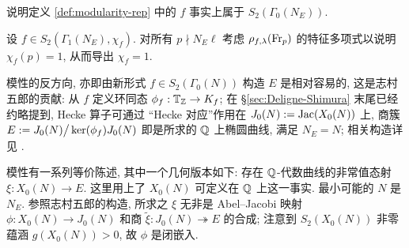 \begin{exercise}
	说明定义 \ref{def:modularity-rep} 中的 $f$ 事实上属于 $S_2\left(\Gamma_0(N_E)\right)$.
	
	\begin{hint}
		设 $f \in S_2(\Gamma_1(N_E), \chi_f)$. 对所有 $p \nmid N_E \ell$ 考虑 $\rho_{f, \lambda}(\operatorname{Fr}_p)$ 的特征多项式以说明 $\chi_f(p) = 1$, 从而导出 $\chi_f = 1$.
	\end{hint}
\end{exercise}

模性的反方向, 亦即由新形式 $f \in S_2(\Gamma_0(N))$ 构造 $E$ 是相对容易的, 这是志村五郎的贡献: 从 $f$ 定义环同态 $\phi_f: \mathbb{T}_{\mathbb{Z}} \to K_f$; 在 \S\ref{sec:Deligne-Shimura} 末尾已经约略提到, Hecke 算子可通过 ``Hecke 对应''作用在 $J_0(N) := \operatorname{Jac}(X_0(N))$ 上, 商簇 $E := J_0(N) \big/ \operatorname{ker}(\phi_f)J_0(N)$ 即是所求的 $\mathbb{Q}$ 上椭圆曲线, 满足 $N_E = N$; 相关构造详见 \cite[Chapters 6---7]{DS05}.


模性有一系列等价陈述, 其中一个几何版本如下: 存在 $\mathbb{Q}$-代数曲线的非常值态射 $\xi: X_0(N) \to E$. 这里用上了 $X_0(N)$ 可定义在 $\mathbb{Q}$ 上这一事实. 最小可能的 $N$ 是 $N_E$. 参照志村五郎的构造, 所求之 $\xi$ 无非是 Abel--Jacobi 映射 $\phi: X_0(N) \to J_0(N)$ 和商 $\tilde{\xi}: J_0(N) \twoheadrightarrow E$ 的合成; 注意到 $S_2(X_0(N))$ 非零蕴涵 $g(X_0(N)) > 0$, 故 $\phi$ 是闭嵌入.

